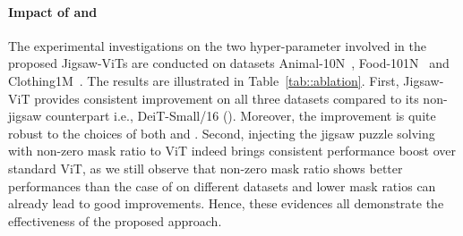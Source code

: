 \documentclass{article}
\begin{document}
\paragraph{Impact of  and } 
The experimental investigations on the two hyper-parameter involved in the proposed Jigsaw-ViTs are conducted on datasets Animal-10N~\cite{song2019selfie}, Food-101N~\cite{lee2018cleannet} and Clothing1M~\cite{xiao2015learning}. 
The results are illustrated in Table~\ref{tab::ablation}. 
First, Jigsaw-ViT provides consistent improvement on all three datasets compared to its non-jigsaw counterpart i.e., DeiT-Small/16 (). Moreover, the improvement is quite robust to the choices of both  and . 
Second, injecting the jigsaw puzzle solving with non-zero mask ratio to ViT indeed brings consistent performance boost over standard ViT, as we still observe that non-zero mask ratio  shows better performances than the case of  on different datasets and lower mask ratios can already lead to good improvements.
Hence, these evidences all demonstrate the effectiveness of the proposed approach. 

\captionsetup[table]{farskip=2pt,captionskip=1pt,aboveskip=4pt}
    \begin{table}[t]
    \renewcommand{\arraystretch}{1.1}
    \begin{center}
        \caption{\textbf{Comparisons between Jigsaw-ViT w/ and w/o pos.~emb.}
        We report test top-1 accuracy (\%) on ImageNet{-1K}~\cite{deng2009imagenet} and noisy label datasets including Animal-10N~\cite{song2019selfie}, Food-101N~\cite{lee2018cleannet} and Clothing1M~\cite{xiao2015learning}.
        We also show how much Jigsaw-ViT w/o pos.~emb. is above Jigsaw-ViT w/ pos.~emb.~with \textcolor{ForestGreen}{}.}
        \label{tab::pos-emb}
    \end{center}
    \end{table}
    
\end{document}

